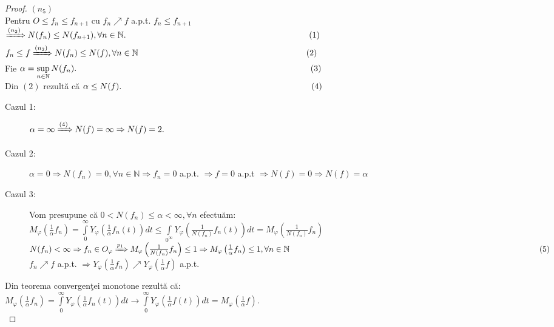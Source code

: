 \documentclass[ a4paper, 12pt]{report}
\theoremstyle{remark}
\numberwithin{equation}{section}
\begin{document}
\begin{proof}
$(n_ 5)$
\\
 Pentru $O \leq f_n \leq f_{n+1}$ cu $f_n \nearrow f$ a.p.t. $f_n \leq f_{n+1}$\\ $\xRightarrow{(n_2)} N(f_n) \leq N(f_{n+1}), \forall n \in \mathbb{N}. \hspace{76mm}(1)$\\
$f_n \leq f \xRightarrow{(n_2)} N(f_n) \leq N(f), \forall n \in \mathbb{N}$ $\hspace{68mm}  (2)$\\
Fie $\alpha = \sup\limits_{n \in \mathbb{N}}N(f_n).  \hspace{97mm} (3)$\\
Din $(2)$ rezult\u a c\u a $ \alpha \leq N(f).  \hspace{79mm} (4)$\\
\begin{description}
\item[Cazul 1:]$\alpha = \infty \xRightarrow{(4)} N(f) = \infty \Rightarrow N(f) = 2.$
\item[Cazul 2:]$\alpha = 0 \Rightarrow N(f_n) = 0, \forall n \in \mathbb{N} \Rightarrow f_n = 0$ a.p.t. $\Rightarrow f = 0$ a.p.t $\Rightarrow N(f) = 0 \Rightarrow N(f) = \alpha$
\item[Cazul 3:] Vom presupune c\u a $0<N(f_n) \leq \alpha<\infty, \forall n$ efectu\u am:\\
$M_\varphi\left (\frac{1}{\alpha}f_n\right ) = \int\limits_{0}^{\infty} Y_\varphi\left (\frac{1}{\alpha} f_n(t)\right ) dt \leq \int\limits_{0^{\infty}}Y_\varphi\left (\frac{1}{N(f_n)}f_n(t)\right ) dt = M_\varphi\left (\frac{1}{N(f_n)} f_n\right )$\\
$N(f_n) < \infty \Rightarrow f_n \in O_\varphi \xRightarrow{p_1} M_\varphi\left (\frac{1}{N(f_n)}f_n\right ) \leq 1 \Rightarrow M_\varphi\left (\frac{1}{\alpha} f_n  \right ) \leq 1,\\ \forall n \in \mathbb{N}  \hspace{108mm}  (5)$\\
$f_n \nearrow f$ a.p.t. $\Rightarrow Y_\varphi\left (\frac{1}{\alpha}f_n \right ) \nearrow Y_\varphi\left (\frac{1}{\alpha}f \right )$ a.p.t.\\
\end{description}
Din teorema convergen\c tei monotone rezult\u a c\u a: \\ $M_\varphi\left (\frac{1}{\alpha}f_n\right ) = \int\limits_{0}^{\infty}Y_\varphi\left (\frac{1}{\alpha}f_n(t)\right ) dt \rightarrow \int\limits_{0}^{\infty} Y_\varphi(\frac{1}{\alpha}f(t)) dt = M_\varphi\left (\frac{1}{\alpha}f\right ).$\\

\end{proof}
\end{document}

